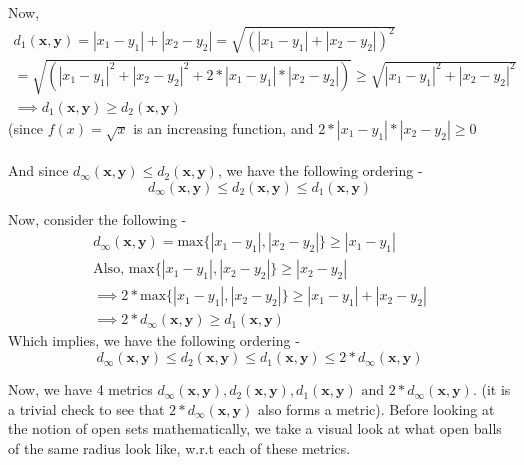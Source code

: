\begin{frame}
    Now,
    \begin{gather*}
        d_1(\boldsymbol{x}, \boldsymbol{y}) = |x_1 - y_1| + |x_2 - y_2| = \sqrt{\left(|x_1 - y_1| + |x_2 - y_2|\right)^2} \\
        = \sqrt{\left(|x_1 - y_1|^2 + |x_2 - y_2|^2 + 2*|x_1 - y_1|*|x_2 - y_2|\right)} \geq \sqrt{|x_1 - y_1|^2 + |x_2 - y_2|^2} \\
        \implies d_1(\boldsymbol{x}, \boldsymbol{y}) \geq d_2(\boldsymbol{x}, \boldsymbol{y})
    \end{gather*}
    (since \( f(x) = \sqrt{x} \) is an increasing function, and \( 2*|x_1 - y_1|*|x_2 - y_2| \geq 0 \) \\\\
    And since \(d_\infty(\boldsymbol{x}, \boldsymbol{y}) \leq d_2(\boldsymbol{x}, \boldsymbol{y})\), we have the following ordering -
    \begin{equation*}
        d_\infty(\boldsymbol{x}, \boldsymbol{y}) \leq d_2(\boldsymbol{x}, \boldsymbol{y}) \leq d_1(\boldsymbol{x}, \boldsymbol{y})
    \end{equation*}
\end{frame}

\begin{frame}
    Now, consider the following - 
    \begin{gather*}
        d_\infty(\boldsymbol{x}, \boldsymbol{y}) = \text{max} \{|x_1 - y_1|, |x_2 - y_2|\} \geq |x_1 - y_1| \\
        \text{Also, } \text{max} \{|x_1 - y_1|, |x_2 - y_2|\} \geq |x_2 - y_2| \\
        \implies 2*\text{max} \{|x_1 - y_1|, |x_2 - y_2|\} \geq |x_1 - y_1| + |x_2 - y_2| \\
        \implies 2*d_\infty(\boldsymbol{x}, \boldsymbol{y}) \geq d_1(\boldsymbol{x}, \boldsymbol{y})
    \end{gather*}
    Which implies, we have the following ordering -
    \begin{equation*}
        d_\infty(\boldsymbol{x}, \boldsymbol{y}) \leq d_2(\boldsymbol{x}, \boldsymbol{y}) \leq d_1(\boldsymbol{x}, \boldsymbol{y}) \leq 2*d_\infty(\boldsymbol{x}, \boldsymbol{y})
    \end{equation*}
\end{frame}

\begin{frame}
    Now, we have 4 metrics \( d_\infty(\boldsymbol{x}, \boldsymbol{y}), d_2(\boldsymbol{x}, \boldsymbol{y}), d_1(\boldsymbol{x}, \boldsymbol{y}) \text{ and } 2*d_\infty(\boldsymbol{x}, \boldsymbol{y})\). (it is a trivial check to see that $2*d_\infty(\boldsymbol{x}, \boldsymbol{y})$ also forms a metric). Before looking at the notion of open sets mathematically, we take a visual look at what open balls of the same radius look like, w.r.t each of these metrics. \\
    \begin{figure}
        \hspace{8em}
        \scalebox{1.2}{}
    \end{figure}
\end{frame}

\begin{frame}
    
\end{frame}